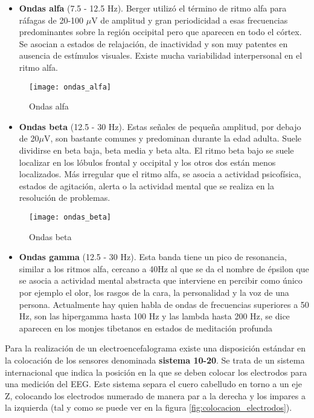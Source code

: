 \begin{itemize}
\item\textbf{Ondas alfa} (7.5 - 12.5 Hz). Berger utilizó el término de ritmo alfa para ráfagas de 20-100 $\mu$V de amplitud y gran periodicidad a esas frecuencias predominantes sobre la región occipital pero que aparecen en todo el córtex. Se asocian a estados de relajación, de inactividad y son muy patentes en ausencia de estímulos visuales. Existe mucha variabilidad interpersonal en el ritmo alfa.
\end{itemize}
\begin{figure} [H]
    \centering
    \texttt{[image: ondas\_alfa]}
    \caption{Ondas alfa \cite{apuntes}}
    \label{fig:ondas_alfa}
\end{figure}

\begin{itemize}
\item\textbf{Ondas beta} (12.5 - 30 Hz). Estas señales de pequeña amplitud, por debajo de 20$\mu$V, son bastante comunes y predominan durante la edad adulta. Suele dividirse en beta baja, beta media y beta alta. El ritmo beta bajo se suele localizar en los lóbulos frontal y occipital y los otros dos están menos localizados. Más irregular que el ritmo alfa, se asocia a actividad psicofísica, estados de agitación, alerta o la actividad mental que se realiza en la resolución de problemas.
\end{itemize}
\begin{figure} [H]
    \centering
    \texttt{[image: ondas\_beta]}
    \caption{Ondas beta \cite{apuntes}}
    \label{fig:ondas_beta}
\end{figure}

\begin{itemize}
\item\textbf{Ondas gamma} (12.5 - 30 Hz). Esta banda tiene un pico de resonancia, similar a los ritmos alfa, cercano a 40Hz al que se da el nombre de épsilon que se asocia a actividad mental abstracta que interviene en percibir como único por ejemplo el olor, los rasgos de la cara, la personalidad y la voz de una persona. Actualmente hay quien habla de ondas de frecuencias superiores a 50 Hz, son las hipergamma hasta 100 Hz y las lambda hasta 200 Hz, se dice aparecen en los monjes tibetanos en estados de meditación profunda
\end{itemize}

Para la realización de un electroencefalograma existe una disposición estándar en la colocación de los sensores denominada \textbf{sistema 10-20}. Se trata de un sistema internacional que indica la posición en la que se deben colocar los electrodos para una medición del \acrshort{EEG}.  Este sistema separa el cuero cabelludo en torno a un eje Z, colocando los electrodos numerado de manera par a la derecha y los impares a la izquierda (tal y como se puede ver en la figura \ref{fig:colocacion_electrodos}).

